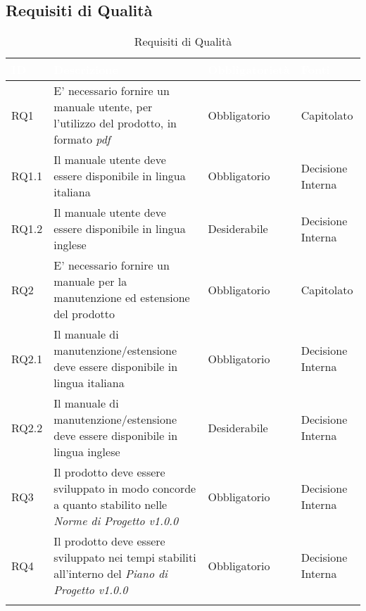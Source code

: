 
\subsection{Requisiti di Qualità}\label{RQ}
\begin{center}
\begin{longtable}[c]{|m{}|m{}|m{}|m{}|}
\hline
\rowcolor{bluelogo}\textbf{\textcolor{white}{ID}} & \textbf{\textcolor{white}{Descrizione}} & \textbf{\textcolor{white}{Obbligatorietà}} & \textbf{\textcolor{white}{Fonti}}\\
\hline \hline
\endhead
RQ1 & E' necessario fornire un manuale utente, per l'utilizzo del prodotto, in formato \textit{pdf} & Obbligatorio & Capitolato\\
\hline
\rowcolor{grigio}RQ1.1 & Il manuale utente deve essere disponibile in lingua italiana & Obbligatorio & Decisione Interna\\
\hline
RQ1.2 & Il manuale utente deve essere disponibile in lingua inglese & Desiderabile & Decisione Interna\\
\hline
\rowcolor{grigio}RQ2 & E' necessario fornire un manuale per la manutenzione ed estensione del prodotto & Obbligatorio & Capitolato\\
\hline
RQ2.1 & Il manuale di manutenzione/estensione deve essere disponibile in lingua italiana & Obbligatorio & Decisione Interna\\
\hline
\rowcolor{grigio}RQ2.2 & Il manuale di manutenzione/estensione deve essere disponibile in lingua inglese & Desiderabile & Decisione Interna\\
\hline
RQ3 & Il prodotto deve essere sviluppato in modo concorde a quanto stabilito nelle \textit{Norme di Progetto v1.0.0} & Obbligatorio & Decisione Interna\\
\hline
\rowcolor{grigio}RQ4 & Il prodotto deve essere sviluppato nei tempi stabiliti all'interno del \textit{Piano di Progetto v1.0.0} & Obbligatorio & Decisione Interna\\
\hline
\caption{Requisiti di Qualità}
\end{longtable}
\end{center}



